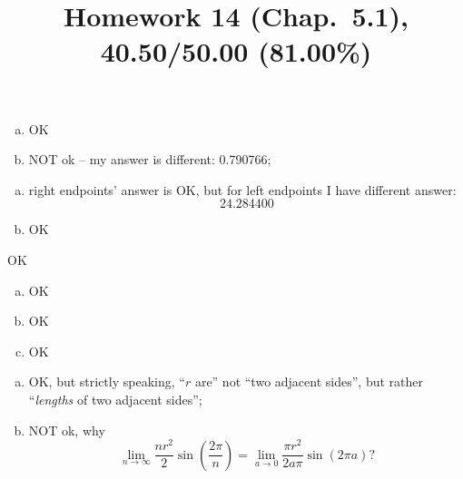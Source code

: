 \documentclass[10pt]{article} %
\title{Homework 14 (Chap.~5.1),
40.50/50.00 (81.00\%)
}
\begin{document}
\maketitle
{}
\begin{enumerate}[(a)]
  \item OK
  \item NOT ok -- my answer is different: 0.790766;
\end{enumerate}
\begin{enumerate}[(a)]
  \item right endpoints' answer is OK, but for left endpoints I have different answer:
    \begin{equation*}
      24.284400
    \end{equation*}
  \item OK
\end{enumerate}
OK
\begin{enumerate}[(a)]
	\item OK
	\item OK
	\item OK
\end{enumerate}
\begin{enumerate}[(a)]
	\item OK, but strictly speaking, ``$r$ are'' not ``two adjacent sides'',
		but rather ``\textit{lengths} of two adjacent sides'';
	\item NOT ok, why
		\begin{equation*}
			\lim_{n\to\infty}\frac{nr^2}{2}\sin\left( \frac{2\pi}{n} \right)
			=\lim_{a\to0}\frac{\pi r^2}{2a\pi}\sin\left( 2\pi a \right)?
		\end{equation*}
\end{enumerate}
\end{document}
